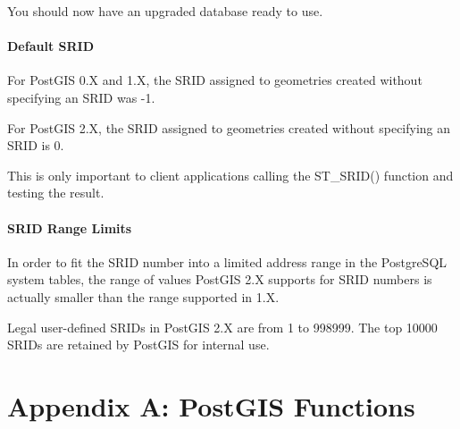 \documentclass[a4paper,11pt,english]{sphinxmanual}
\begin{document}
You should now have an upgraded database ready to use.


\subsubsection{Default SRID}
\label{\detokenize{maintenance:default-srid}}
For PostGIS 0.X and 1.X, the SRID assigned to geometries created without specifying an SRID was -1.

For PostGIS 2.X, the SRID assigned to geometries created without specifying an SRID is 0.

This is only important to client applications calling the ST\_SRID() function and testing the result.


\subsubsection{SRID Range Limits}
\label{\detokenize{maintenance:srid-range-limits}}
In order to fit the SRID number into a limited address range in the PostgreSQL system tables, the range of values PostGIS 2.X supports for SRID numbers is actually smaller than the range supported in 1.X.

Legal user-defined SRIDs in PostGIS 2.X are from 1 to 998999. The top 10000 SRIDs are retained by PostGIS for internal use.


\chapter{Appendix A: PostGIS Functions}
\label{\detokenize{postgis-functions:appendix-a-postgis-functions}}\label{\detokenize{postgis-functions:postgis-functions}}\label{\detokenize{postgis-functions::doc}}
\end{document}
